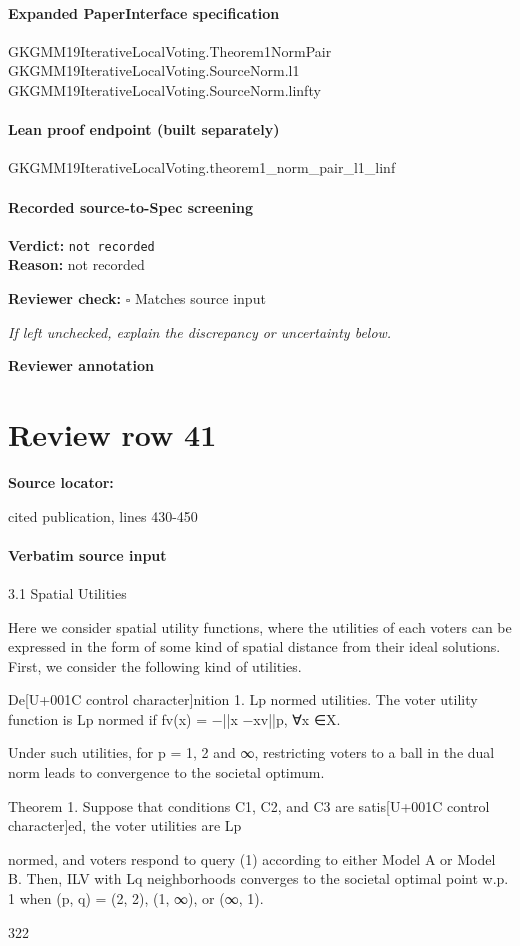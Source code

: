 \documentclass[10pt]{article}
\newcommand{\reviewerbox}{%
  \par\noindent\fbox{\parbox{0.96\linewidth}{\rule{0pt}{0.38in}}}\par
}
\newcommand{\reviewmatch}[1]{%
  \par\noindent\textbf{Reviewer check:} $\square$\; #1\par
  \noindent\emph{If left unchecked, explain the discrepancy or uncertainty below.}\par
}
\begin{document}
\paragraph{Expanded PaperInterface specification}
\begin{ReviewVerbatim}
GKGMM19IterativeLocalVoting.Theorem1NormPair GKGMM19IterativeLocalVoting.SourceNorm.l1
  GKGMM19IterativeLocalVoting.SourceNorm.linfty
\end{ReviewVerbatim}

\paragraph{Lean proof endpoint (built separately)}\begin{ReviewVerbatim}
GKGMM19IterativeLocalVoting.theorem1_norm_pair_l1_linf
\end{ReviewVerbatim}

\paragraph{Recorded source-to-Spec screening}
\textbf{Verdict:} \texttt{not recorded}
\\
\textbf{Reason:} not recorded
\reviewmatch{Matches source input}
\noindent\textbf{Reviewer annotation}\par
\reviewerbox
\clearpage
\hypertarget{source-claim-1ffdcf0343191a12}{}
\section*{Review row 41}
\textbf{Source locator:} {\footnotesize\raggedright cited publication, lines 430-\allowbreak{}450\par}
\paragraph{Verbatim source input}
\begin{ReviewVerbatim}
3.1 Spatial Utilities

Here we consider spatial utility functions, where the utilities of each voters can be expressed
in the form of some kind of spatial distance from their ideal solutions. First, we consider
the following kind of utilities.

De[U+001C control character]nition 1. Lp normed utilities. The voter utility function is Lp normed if fv(x) =
−||x −xv||p, ∀x ∈X.

Under such utilities, for p = 1, 2 and ∞, restricting voters to a ball in the dual norm
leads to convergence to the societal optimum.

Theorem 1. Suppose that conditions C1, C2, and C3 are satis[U+001C control character]ed, the voter utilities are Lp

normed, and voters respond to query (1) according to either Model A or Model B. Then,
ILV with Lq neighborhoods converges to the societal optimal point w.p. 1 when (p, q) = (2, 2),
(1, ∞), or (∞, 1).

322
\end{ReviewVerbatim}
\end{document}

